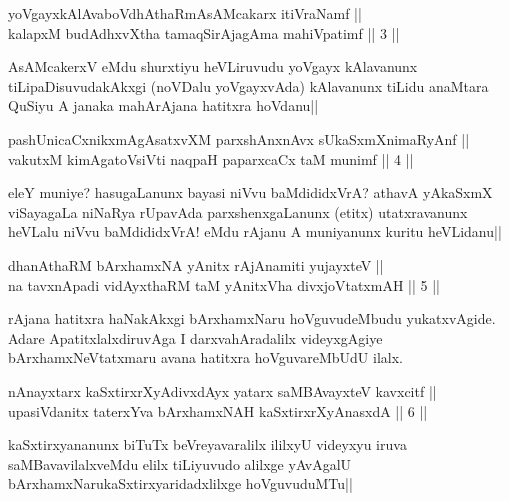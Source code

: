 \begin{shl}
yoVgayxkAlAvaboVdhAthaRmAsAMcakarx itiVraNamf || \\
kalapxM budAdhxvX\s tha tamaqSirAjagAma mahiVpatimf ||  3 ||  
\end{shl}

\begin{artha}
AsAMcakerxV eMdu shurxtiyu heVLiruvudu yoVgayx kAlavanunx tiLipaDisuvudakAkxgi (noVDalu yoVgayxvAda) kAlavanunx tiLidu anaMtara QuSiyu A janaka mahArAjana hatitxra hoVdanu||
\end{artha}


\begin{shl}
pashUnicaCxnikxmAgAsatxvXM parxshAnxnAvx sUkaSxmXnimaRyAnf || \\
vakutxM kimAgatoV\s siVti naqpaH paparxcaCx taM munimf ||  4 ||  
\end{shl}

\begin{artha}
eleY muniye? hasugaLanunx bayasi niVvu baMdididxVrA? athavA yAkaSxmX viSayagaLa niNaRya rUpavAda parxshenxgaLanunx (etitx) utatxravanunx heVLalu niVvu baMdididxVrA! eMdu rAjanu A muniyanunx kuritu heVLidanu||
\end{artha}


\begin{shl}
dhanAthaRM bArxhamxNA yAnitx rAjAnamiti yujayxteV || \\
na tavxnApadi vidAyxthaRM taM yAnitxVha divxjoVtatxmAH ||  5 ||  
\end{shl}

\begin{artha}
rAjana hatitxra haNakAkxgi bArxhamxNaru hoVguvudeMbudu yukatxvAgide. Adare ApatitxlalxdiruvAga I darxvahAradalilx videyxgAgiye bArxhamxNeVtatxmaru avana hatitxra hoVguvareMbUdU ilalx.
\end{artha}

\begin{shl}
nAnayxtarx kaSxtirxrXyAdivxdAyx yatarx saMBAvayxteV kavxcitf || \\
upasiVdanitx taterxYva bArxhamxNAH kaSxtirxrXyAnasxdA ||  6 ||  
\end{shl}

\begin{artha}
kaSxtirxyananunx biTuTx beVreyavaralilx ililxyU videyxyu iruva saMBavavilalxveMdu elilx tiLiyuvudo alilxge yAvAgalU bArxhamxNarukaSxtirxyaridadxlilxge hoVguvuduMTu||
\end{artha}

